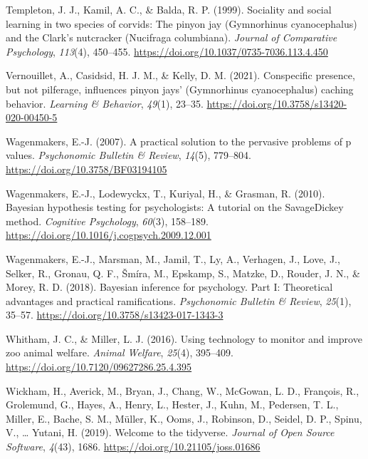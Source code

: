 \documentclass[
  pub]{apa6}
\newlength{\cslhangindent}
\newlength{\cslentryspacingunit} %
\newenvironment{CSLReferences}[2] %
 {%
  \setlength{\parindent}{0pt}
  \ifodd #1
  \let\oldpar\par
  \def\par{\hangindent=\cslhangindent\oldpar}
  \fi
  \setlength{\parskip}{#2\cslentryspacingunit}
 }%
 {}
\begin{document}
\begin{CSLReferences}{1}{0}
\leavevmode{}%
Templeton, J. J., Kamil, A. C., \& Balda, R. P. (1999). Sociality and social learning in two species of corvids: The pinyon jay ({Gymnorhinus} cyanocephalus) and the {Clark}'s nutcracker ({Nucifraga} columbiana). \emph{Journal of Comparative Psychology}, \emph{113}(4), 450--455. \url{https://doi.org/10.1037/0735-7036.113.4.450}

\leavevmode{}%
Vernouillet, A., Casidsid, H. J. M., \& Kelly, D. M. (2021). Conspecific presence, but not pilferage, influences pinyon jays' ({Gymnorhinus} cyanocephalus) caching behavior. \emph{Learning \& Behavior}, \emph{49}(1), 23--35. \url{https://doi.org/10.3758/s13420-020-00450-5}

\leavevmode{}%
Wagenmakers, E.-J. (2007). A practical solution to the pervasive problems of p values. \emph{Psychonomic Bulletin \& Review}, \emph{14}(5), 779--804. \url{https://doi.org/10.3758/BF03194105}

\leavevmode{}%
Wagenmakers, E.-J., Lodewyckx, T., Kuriyal, H., \& Grasman, R. (2010). Bayesian hypothesis testing for psychologists: {A} tutorial on the {Savage}{\textendash}{Dickey} method. \emph{Cognitive Psychology}, \emph{60}(3), 158--189. \url{https://doi.org/10.1016/j.cogpsych.2009.12.001}

\leavevmode{}%
Wagenmakers, E.-J., Marsman, M., Jamil, T., Ly, A., Verhagen, J., Love, J., Selker, R., Gronau, Q. F., Šmíra, M., Epskamp, S., Matzke, D., Rouder, J. N., \& Morey, R. D. (2018). Bayesian inference for psychology. {Part I}: {Theoretical} advantages and practical ramifications. \emph{Psychonomic Bulletin \& Review}, \emph{25}(1), 35--57. \url{https://doi.org/10.3758/s13423-017-1343-3}

\leavevmode{}%
Whitham, J. C., \& Miller, L. J. (2016). Using technology to monitor and improve zoo animal welfare. \emph{Animal Welfare}, \emph{25}(4), 395--409. \url{https://doi.org/10.7120/09627286.25.4.395}

\leavevmode{}%
Wickham, H., Averick, M., Bryan, J., Chang, W., McGowan, L. D., François, R., Grolemund, G., Hayes, A., Henry, L., Hester, J., Kuhn, M., Pedersen, T. L., Miller, E., Bache, S. M., Müller, K., Ooms, J., Robinson, D., Seidel, D. P., Spinu, V., \ldots{} Yutani, H. (2019). Welcome to the {tidyverse}. \emph{Journal of Open Source Software}, \emph{4}(43), 1686. \url{https://doi.org/10.21105/joss.01686}


\end{CSLReferences}
\end{document}
